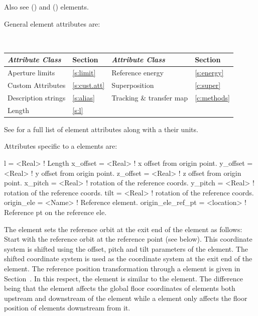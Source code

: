 Also see  () and  () elements.

General  element attributes are:
\begin{center}
\tt
\begin{tabular}{llll} \toprule
  {\sl Attribute Class}      & Section           & {\sl Attribute Class}      & Section         \\ \midrule
  Aperture limits            & \ref{s:limit}     & Reference energy           & \ref{s:energy}  \\
  Custom Attributes          & \ref{s:cust.att}  & Superposition              & \ref{c:super}   \\
  Description strings        & \ref{s:alias}     & Tracking \& transfer map   & \ref{c:methods} \\
  Length                     & \ref{s:l}         &                            &                 \\
  \bottomrule
\end{tabular}
\end{center}
\toffset
See  for a full list of element attributes along with a their units.

Attributes specific to a  elements are:
\begin{example}
  l                 = <Real>     ! Length
  x_offset          = <Real>     ! x offset from origin point.
  y_offset          = <Real>     ! y offset from origin point.
  z_offset          = <Real>     ! z offset from origin point.
  x_pitch           = <Real>     ! rotation of the reference coords.
  y_pitch           = <Real>     ! rotation of the reference coords.
  tilt              = <Real>     ! rotation of the reference coords.
  origin_ele        = <Name>     ! Reference element.
  origin_ele_ref_pt = <location> ! Reference pt on the reference ele.
\end{example}

The  element sets the reference orbit at the exit end of the 
element as follows: Start with the reference orbit at the  reference point (see
below). This coordinate system is shifted using the offset, pitch and tilt parameters of the
 element. The shifted coordinate system is used as the coordinate system at the exit
end of the  element. The reference position transformation through a
 element is given in Section~. In this respect, the 
element is similar to the  element. The difference being that the  element affects
the global floor coordinates of elements both upstream and downstream of the  element while a
 element only affects the floor position of elements downstream from it.
 
